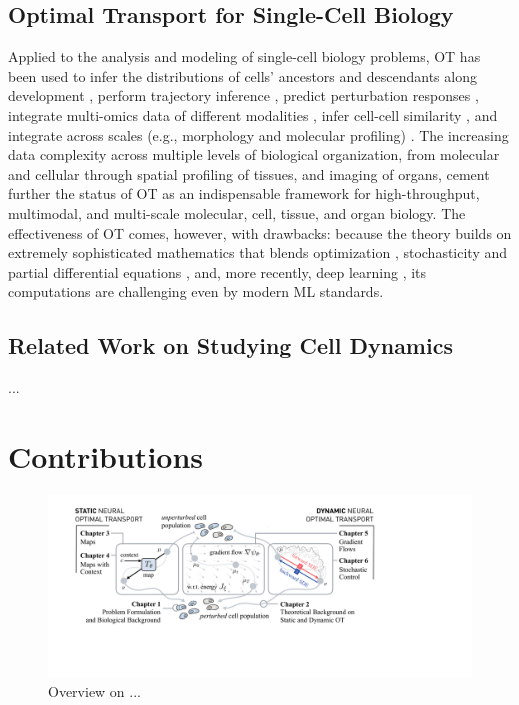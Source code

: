 \subsection{Optimal Transport for Single-Cell Biology}
Applied to the analysis and modeling of single-cell biology problems, OT has been used to infer the distributions of cells' ancestors and descendants along development \citep{schiebinger2019optimal}, perform trajectory inference \citep{bunne2022proximal, forrow2021lineageot, bunne2022recovering, lavenant2021towards, schiebinger2019optimal, tong2020trajectorynet, yang2020predicting, zhang2021optimal, chizat2022trajectory}, predict perturbation responses \citep{bunne2021learning, yang2018scalable, lubeck2022neural}, integrate multi-omics data of different modalities \citep{demetci2022scot}, infer cell-cell similarity \citep{huizing2022optimal}, and integrate across scales (e.g., morphology and molecular profiling) \citep{yang2021multi}. The increasing data complexity across multiple levels of biological organization, from molecular and cellular through spatial profiling \citep{moriel2021novosparc} of tissues, and imaging of organs, cement further the status of OT as an indispensable framework for high-throughput, multimodal, and multi-scale molecular, cell, tissue, and organ biology. The effectiveness of OT comes, however, with drawbacks: because the theory builds on extremely sophisticated mathematics that blends optimization \citep{cuturi2013sinkhorn, cuturi2022optimal}, stochasticity \citep{chizat2022trajectory, bunne2022recovering} and partial differential equations \citep{bunne2022proximal}, and, more recently, deep learning \citep{tong2020trajectorynet, bunne2021learning, bunne2022supervised, yang2018scalable, lubeck2022neural, yang2021multi}, its computations are challenging even by modern ML standards.


\subsection{Related Work on Studying Cell Dynamics}

...

\section{Contributions}

\begin{figure}[t]
  \includegraphics[width=\textwidth]{figures/fig_overview_thesis.pdf}
  \caption{Overview on ...}
  \label{fig:overview_thesis}
\end{figure}

